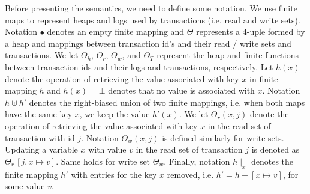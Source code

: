 \documentclass[3p,times,procedia]{elsarticle}
\theoremstyle{definition}
\begin{document}

Before presenting the semantics, we need to define some notation.
We use finite maps to  represent heaps and logs used by transactions (i.e. read and write
sets). Notation $\bullet$ denotes an empty finite mapping and
$\Theta$ represents a 4-uple formed by a heap and mappings between transaction id's and their
read / write sets and transactions. We let $\Theta_h$, $\Theta_r$, $\Theta_w$, and $\Theta_T$ represent the heap and finite
functions between transaction ids and their logs and transactions,
respectively. Let $h(x)$ denote the operation
of retrieving the value associated with key $x$ in finite mapping 
$h$ and $h(x)=\bot$ denotes that no value is associated
with $x$. Notation $h \uplus h'$ denotes the right-biased union of 
two finite mappings, i.e. when both maps have the same key $x$, we keep
the value $h'(x)$. We let $\Theta_r(x,j)$ denote the operation of
retrieving the value associated with key $x$ in the read set of transaction
with id $j$. Notation $\Theta_w(x,j)$ is defined similarly for write sets. Updating
a variable $x$ with value $v$ in the read set of transaction $j$ is denoted as
$\Theta_r\,[j,x\mapsto v]$. Same holds for write set $\Theta_w$.
Finally, notation $h\mid_{x}$ denotes the finite mapping $h'$ with entries for the key $x$
removed, i.e. $h' = h - [ x \mapsto v]$, for some value $v$.
\end{document}
